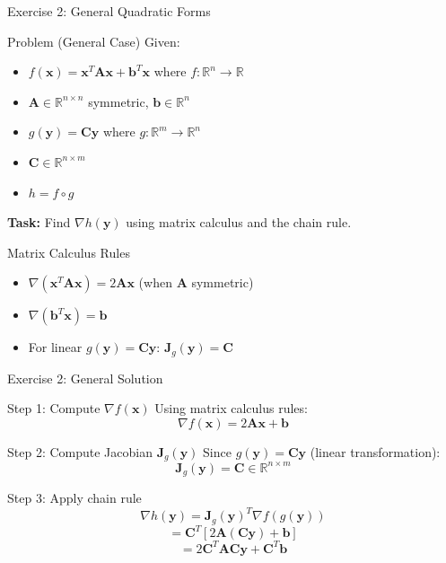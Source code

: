 \documentclass[aspectratio=1610]{beamer}
\begin{document}
\begin{frame}{Exercise 2: General Quadratic Forms}
  \begin{block}{Problem (General Case)}
    Given:
    \begin{itemize}
      \item $f(\mathbf{x}) = \mathbf{x}^T\mathbf{A}\mathbf{x} + \mathbf{b}^T\mathbf{x}$ where $f: \mathbb{R}^n \to \mathbb{R}$
      \item $\mathbf{A} \in \mathbb{R}^{n \times n}$ symmetric, $\mathbf{b} \in \mathbb{R}^n$
      \item $g(\mathbf{y}) = \mathbf{C}\mathbf{y}$ where $g: \mathbb{R}^m \to \mathbb{R}^n$
      \item $\mathbf{C} \in \mathbb{R}^{n \times m}$
      \item $h = f \circ g$
    \end{itemize}
    \vspace{0.3cm}
    \textbf{Task:} Find $\nabla h(\mathbf{y})$ using matrix calculus and the chain rule.
  \end{block}
  
  \begin{block}{Matrix Calculus Rules}
    \begin{itemize}
      \item $\nabla(\mathbf{x}^T\mathbf{A}\mathbf{x}) = 2\mathbf{A}\mathbf{x}$ (when $\mathbf{A}$ symmetric)
      \item $\nabla(\mathbf{b}^T\mathbf{x}) = \mathbf{b}$
      \item For linear $g(\mathbf{y}) = \mathbf{C}\mathbf{y}$: $\mathbf{J}_g(\mathbf{y}) = \mathbf{C}$
    \end{itemize}
  \end{block}
\end{frame}

\begin{frame}{Exercise 2: General Solution}
  \begin{block}{Step 1: Compute $\nabla f(\mathbf{x})$}
    Using matrix calculus rules:
    $$\nabla f(\mathbf{x}) = 2\mathbf{A}\mathbf{x} + \mathbf{b}$$
  \end{block}
  
  \begin{block}{Step 2: Compute Jacobian $\mathbf{J}_g(\mathbf{y})$}
    Since $g(\mathbf{y}) = \mathbf{C}\mathbf{y}$ (linear transformation):
    $$\mathbf{J}_g(\mathbf{y}) = \mathbf{C} \in \mathbb{R}^{n \times m}$$
  \end{block}
  
  \begin{block}{Step 3: Apply chain rule}
    $$\nabla h(\mathbf{y}) = \mathbf{J}_g(\mathbf{y})^T \nabla f(g(\mathbf{y}))$$
    $$= \mathbf{C}^T [2\mathbf{A}(\mathbf{C}\mathbf{y}) + \mathbf{b}]$$
    $$= 2\mathbf{C}^T\mathbf{A}\mathbf{C}\mathbf{y} + \mathbf{C}^T\mathbf{b}$$
  \end{block}
\end{frame}
\end{document}
